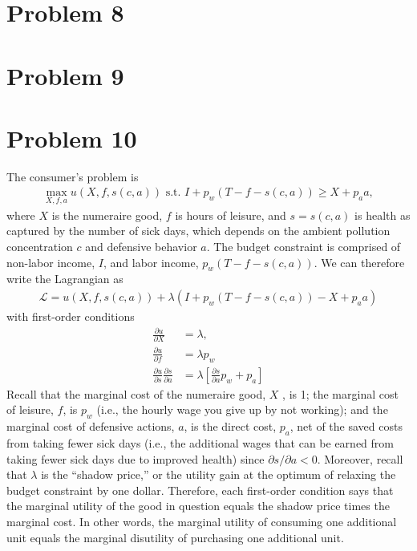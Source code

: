 \documentclass[12pt]{article}
\begin{document}
\section*{Problem 8}

\section*{Problem 9}

\section*{Problem 10}
The consumer’s problem is
\begin{align*}
	\max_{X, f, a} u(X, f, s(c,a)) \text{ s.t. } I + p_w(T-f-s(c,a)) \geq X + p_a a,
\end{align*}
where $X$ is the numeraire good, $f$ is hours of leisure, and $s=s(c,a)$ is health as captured by the number of sick days, which depends on the ambient pollution concentration $c$ and defensive behavior $a$. The budget constraint is comprised of non-labor income, $I$, and labor income, $p_w(T-f-s(c,a))$. We can therefore write the Lagrangian as
\begin{align*}
	\mathcal{L} = u(X, f, s(c,a)) + \lambda(I + p_w(T-f-s(c,a)) - X + p_a a)
\end{align*}
with first-order conditions
\begin{align}
	\frac{\partial u}{\partial X} &= \lambda, \\
	\frac{\partial u}{\partial f} &= \lambda p_w \\
	\frac{\partial u}{\partial s} \frac{\partial s}{\partial a} &= \lambda \left[ \frac{\partial s}{\partial a} p_w + p_a  \right] \label{eqn:foc_a}
\end{align}
Recall that the marginal cost of the numeraire good, $X$ , is 1; the marginal cost of leisure, $f$, is $p_w$ (i.e., the hourly wage you give up by not working); and the marginal cost of defensive actions, $a$, is the direct cost, $p_a$, net of the saved costs from taking fewer sick days (i.e., the additional wages that can be earned from taking fewer sick days due to improved health) since $\partial s/\partial a < 0$. Moreover, recall that $\lambda$ is the ``shadow price,'' or the utility gain at the optimum of relaxing the budget constraint by one dollar. Therefore, each first-order condition says that the marginal utility of the good in question equals the shadow price times the marginal cost. In other words, the marginal utility of consuming one additional unit equals the marginal disutility of purchasing one additional unit.
\end{document}
